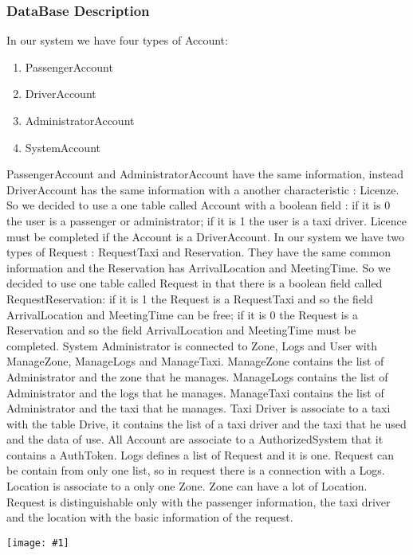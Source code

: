 \documentclass[11pt, a4paper,titlepage]{article}
\newcommand{\image}[1]{
	\begin{center}
		\noindent \texttt{[image: \#1]}
	\end{center}
	}
\begin{document}
\subsubsection{DataBase Description}
In our system we have four types of Account:
\begin{enumerate}
	\item {PassengerAccount}
	\item {DriverAccount}
	\item {AdministratorAccount}
	\item {SystemAccount}
\end{enumerate}	
PassengerAccount and AdministratorAccount have the same information, instead DriverAccount has the same information with a another characteristic : Licenze.
So we decided to use a one table called Account with a boolean field :
if it is 0 the user is a passenger or administrator; if it is 1 the user is a taxi driver.
Licence must be completed if the Account is a DriverAccount.
In our system we have two types of Request :
RequestTaxi and Reservation.
They have the same common information and the Reservation has ArrivalLocation and MeetingTime.
So we decided to use one table called Request in that there is a boolean field called RequestReservation:
if it is 1 the Request is a RequestTaxi and so the field ArrivalLocation and MeetingTime can be free;
if it is 0 the Request is a Reservation and so the field ArrivalLocation and MeetingTime must be completed.
System Administrator is connected to Zone, Logs and User with ManageZone, ManageLogs and ManageTaxi.
ManageZone contains the list of Administrator and the zone that he manages.
ManageLogs contains the list of Administrator and the logs that he manages.
ManageTaxi contains the list of Administrator and the taxi that he manages.
Taxi Driver is associate to a taxi with the table Drive, it contains the list of a taxi driver and the taxi that he used and the data of use.
All Account are associate to a AuthorizedSystem that it contains a AuthToken.
Logs defines a list of Request and it is one.
Request can be contain from only one list, so in request there is a connection with a Logs.
Location is associate to a only one Zone.
Zone can have a lot of Location.
Request is distinguishable only with the passenger information, the taxi driver and  the location with the basic information of the request.
\image{schema_er_database.png}
\end{document}
